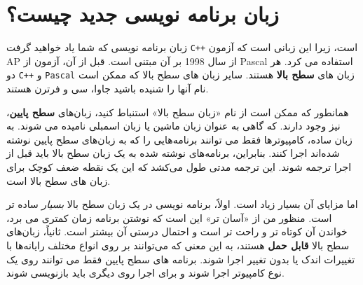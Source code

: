 \section{زبان برنامه نویسی جدید چیست؟}

زبان برنامه نویسی که شما یاد خواهید گرفت \texttt{C++} است، زیرا این زبانی است که آزمون AP از سال 1998 بر آن مبتنی است. قبل از آن، آزمون از Pascal استفاده می کرد. هر دو \texttt{C++} و \texttt{Pascal} زبان های \textbf{سطح بالا} هستند. سایر زبان های سطح بالا که ممکن است نام آنها را شنیده باشید جاوا، سی و فرترن هستند.


همانطور که ممکن است از نام «زبان سطح بالا» استنباط کنید، زبان‌های \textbf{سطح پایین}، نیز وجود دارند.  که گاهی به عنوان زبان ماشین یا زبان اسمبلی نامیده می شوند. به زبان ساده، کامپیوترها فقط می توانند برنامه‌هایی را که به زبان‌های سطح پایین نوشته شده‌اند اجرا کنند. بنابراین، برنامه‌های نوشته شده به یک زبان سطح بالا باید قبل از اجرا ترجمه شوند. این ترجمه مدتی طول می‌کشد که این یک نقطه ضعف کوچک برای زبان های سطح بالا است.



اما مزایای آن بسیار زیاد است. اولاً، برنامه نویسی در یک زبان سطح بالا \emph{بسیار} ساده تر است. منظور من از «آسان تر» این است که نوشتن برنامه زمان کمتری می برد، خواندن آن کوتاه تر و راحت تر است و احتمال درستی آن بیشتر است. ثانیاً، زبان‌های سطح بالا \textbf{قابل حمل} هستند، به این معنی که می‌توانند بر روی انواع مختلف رایانه‌ها با تغییرات اندک یا بدون تغییر اجرا شوند. برنامه های سطح پایین فقط می توانند روی یک نوع کامپیوتر اجرا شوند و برای اجرا روی دیگری باید بازنویسی شوند.

